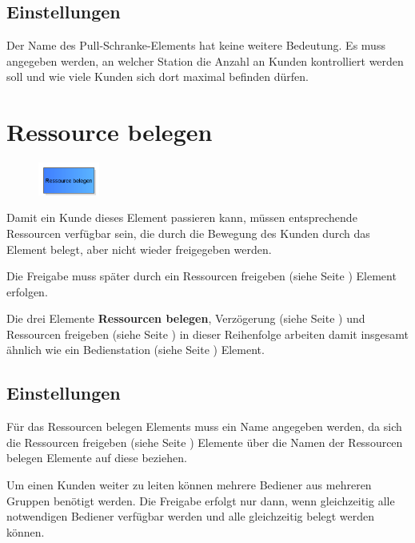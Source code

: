 \subsection*{Einstellungen}

Der Name des Pull-Schranke-Elements hat keine weitere Bedeutung. Es muss angegeben
werden, an welcher Station die Anzahl an Kunden kontrolliert werden soll und wie
viele Kunden sich dort maximal befinden dürfen.


\section{Ressource belegen}
\label{ref:ModelElementSeize}

\begin{figure}
\vspace{-22pt}
\includegraphics[width=2cm]{imageModelElementSeize.png}
\vspace{-22pt}
\end{figure}

Damit ein Kunde dieses Element passieren kann, müssen entsprechende Ressourcen verfügbar sein, die durch die Bewegung des
Kunden durch das Element belegt, aber nicht wieder freigegeben werden.

Die Freigabe muss später durch ein Ressourcen freigeben (siehe Seite \pageref{ref:ModelElementRelease}) Element erfolgen.

Die drei Elemente \textbf{Ressourcen belegen}, Verzögerung (siehe Seite \pageref{ref:ModelElementDelay}) und
Ressourcen freigeben (siehe Seite \pageref{ref:ModelElementRelease}) in dieser Reihenfolge arbeiten damit
insgesamt ähnlich wie ein Bedienstation (siehe Seite \pageref{ref:ModelElementProcess}) Element.

\subsection*{Einstellungen}

Für das Ressourcen belegen Elements muss ein Name angegeben werden, da sich die
Ressourcen freigeben (siehe Seite \pageref{ref:ModelElementRelease}) Elemente über die Namen
der Ressourcen belegen Elemente auf diese beziehen.

Um einen Kunden weiter zu leiten können mehrere Bediener aus mehreren Gruppen benötigt werden. Die Freigabe erfolgt
nur dann, wenn gleichzeitig alle notwendigen Bediener verfügbar werden und alle gleichzeitig belegt werden können.

